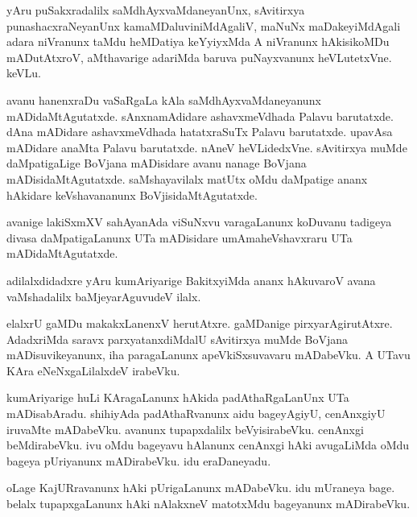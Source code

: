 \begin{mng}
yAru puSakxradalilx saMdhAyxvaMdaneyanUnx, sAvitirxya punashacxraNeyanUnx kamaMDaluviniMdAgaliV, maNuNx maDakeyiMdAgali adara niVranunx taMdu heMDatiya keYyiyxMda A niVranunx hAkisikoMDu mADutAtxroV, aMthavarige adariMda baruva puNayxvanunx heVLutetxVne. keVLu.
\end{mng}

\begin{mng}
avanu hanenxraDu vaSaRgaLa kAla saMdhAyxvaMdaneyanunx mADidaMtAgutatxde. sAnxnamAdidare ashavxmeVdhada Palavu barutatxde. dAna mADidare ashavxmeVdhada hatatxraSuTx Palavu barutatxde. upavAsa mADidare anaMta Palavu barutatxde. nAneV heVLidedxVne. sAvitirxya muMde daMpatigaLige BoVjana mADisidare avanu nanage BoVjana mADisidaMtAgutatxde. saMshayavilalx matUtx oMdu daMpatige ananx hAkidare keVshavananunx BoVjisidaMtAgutatxde.
\end{mng}

\begin{mng}
avanige lakiSxmXV sahAyanAda viSuNxvu varagaLanunx koDuvanu tadigeya divasa daMpatigaLanunx UTa mADisidare umAmaheVshavxraru UTa mADidaMtAgutatxde.
\end{mng}

\begin{mng}
adilalxdidadxre yAru kumAriyarige BakitxyiMda ananx hAkuvaroV avana vaMshadalilx baMjeyarAguvudeV ilalx.
\end{mng}

\begin{mng}
elalxrU gaMDu makakxLanenxV herutAtxre. gaMDanige pirxyarAgirutAtxre. AdadxriMda saravx parxyatanxdiMdalU sAvitirxya muMde BoVjana mADisuvikeyanunx, iha paragaLanunx apeVkiSxsuvavaru mADabeVku. A UTavu KAra eNeNxgaLilalxdeV irabeVku.
\end{mng}

\begin{mng}
kumAriyarige huLi KAragaLanunx hAkida padAthaRgaLanUnx UTa mADisabAradu. shihiyAda padAthaRvanunx aidu bageyAgiyU, cenAnxgiyU iruvaMte mADabeVku. avanunx tupapxdalilx beVyisirabeVku. cenAnxgi beMdirabeVku. ivu oMdu bageyavu hAlanunx cenAnxgi hAki avugaLiMda oMdu bageya pUriyanunx mADirabeVku. idu eraDaneyadu.
\end{mng}

\begin{mng}
oLage KajURravanunx hAki pUrigaLanunx mADabeVku. idu mUraneya bage. belalx tupapxgaLanunx hAki nAlakxneV matotxMdu bageyanunx mADirabeVku.
\end{mng}

